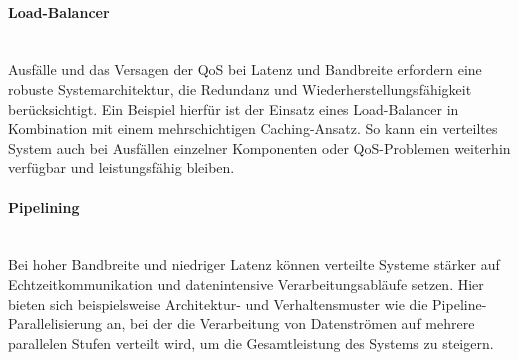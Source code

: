 \paragraph{Load-Balancer \\\\}
Ausfälle und das Versagen der QoS bei Latenz und Bandbreite erfordern eine robuste Systemarchitektur, die Redundanz und Wiederherstellungsfähigkeit berücksichtigt. Ein Beispiel hierfür ist der Einsatz eines Load-Balancer in Kombination mit einem mehrschichtigen Caching-Ansatz. So kann ein verteiltes System auch bei Ausfällen einzelner Komponenten oder QoS-Problemen weiterhin verfügbar und leistungsfähig bleiben.
\paragraph{Pipelining \\\\}
Bei hoher Bandbreite und niedriger Latenz können verteilte Systeme stärker auf Echtzeitkommunikation und datenintensive Verarbeitungsabläufe setzen. Hier bieten sich beispielsweise Architektur- und Verhaltensmuster wie die Pipeline-Parallelisierung an, bei der die Verarbeitung von Datenströmen auf mehrere parallelen Stufen verteilt wird, um die Gesamtleistung des Systems zu steigern.

